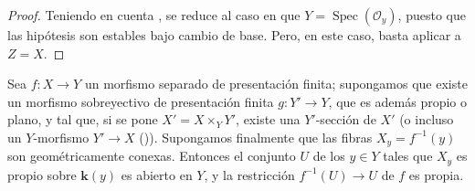 \begin{proof}
Teniendo en cuenta , se reduce al caso en que $Y=\operatorname{Spec}(\mathcal O_y)$, puesto que las hipótesis son estables bajo cambio de base.
Pero, en este caso, basta aplicar  a $Z=X$.
\end{proof}

\begin{corollary}[15.7.11]
\label{IV.15.7.11}
Sea $f:X\to Y$ un morfismo separado de presentación finita; supongamos que existe un morfismo sobreyectivo de presentación finita $g:Y'\to Y$, que es además propio \textup{o} plano, y tal que, si se pone $X'=X\times_Y Y'$, existe una $Y'$-sección de $X'$ (o incluso un $Y$-morfismo $Y'\to X$ \textup{()}).
Supongamos finalmente que las fibras $X_y=f^{-1}(y)$ son geométricamente conexas.
Entonces el conjunto $U$ de los $y\in Y$ tales que $X_y$ es propio sobre $\boldsymbol{k}(y)$ es abierto en $Y$, y la restricción $f^{-1}(U)\to U$ de $f$ es propia.
\end{corollary}


